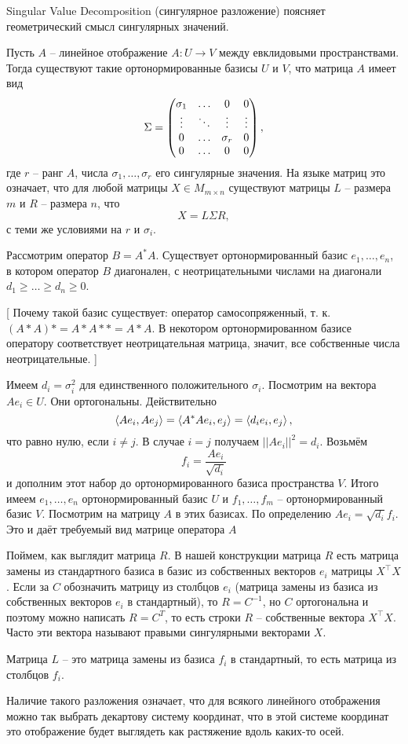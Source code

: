 Singular Value Decomposition (сингулярное разложение) поясняет геометрический смысл сингулярных значений.

 Пусть $A$ -- линейное отображение $A\colon U \to V$ между евклидовыми пространствами. Тогда существуют такие ортонормированные базисы $U$ и $V$, что матрица $A$ имеет вид 
$$\Sigma = \begin{pmatrix} \sigma_1 &\dots& 0 & 0\\
 \vdots & \ddots &\vdots & \vdots\\
 0 & \dots & \sigma_r & 0\\
 0 &  \dots & 0 & 0 \end{pmatrix},$$
 где $r$ -- ранг $A$, числа $\sigma_1, \dots, \sigma_r$ его сингулярные значения.
На языке матриц это означает, что для любой матрицы $X \in M_{m\times n}$ существуют матрицы $L$ -- размера $m$ и $R$ -- размера $n$,  что
$$X= L \Sigma R,$$
 с теми же условиями на $r$ и $\sigma_i$.
 
\proof Рассмотрим оператор $B = A^{*}A$. Существует ортонормированный базис $e_1,\dots,e_n$, в котором оператор $B$ диагонален, с неотрицательными числами на диагонали $d_1\geq\dots\geq d_n\geq 0$. 

[ Почему такой базис существует: оператор самосопряженный, т. к. $(A*A)* = A*A** = A*A$. В некотором ортонормированном базисе оператору соответствует неотрицательная матрица, значит, все собственные числа неотрицательные. ]

Имеем  $d_i=\sigma_i^2$ для единственного положительного $\sigma_i$. 
Посмотрим на вектора $Ae_i \in U$. Они ортогональны. Действительно
$$\left\langle Ae_i, Ae_j\right\rangle = \left\langle A^{*}Ae_i,e_j \right\rangle = \left\langle d_i e_i,e_j\right\rangle,$$
что равно нулю, если $i\neq j$. В случае $i=j$ получаем $||Ae_i||^2=d_i$. Возьмём 
$$f_i=\frac{Ae_i}{\sqrt{d_i}}$$
и дополним этот набор до ортонормированного базиса пространства $V$. Итого имеем $e_1,\dots,e_n$ ортонормированный базис $U$ и $f_1,\dots,f_m$ -- ортонормированный базис $V$.
Посмотрим на матрицу $A$ в этих базисах. По определению $Ae_i=\sqrt{d_i}f_i$. Это и даёт требуемый вид матрице оператора $A$

Поймем, как выглядит матрица $R$. В нашей конструкции матрица $R$ есть матрица замены из стандартного базиса в базис из собственных векторов $e_i$ матрицы $X^{\top}X$. Если за $C$ обозначить матрицу из столбцов $e_i$ (матрица замены из базиса из собственных векторов $e_i$ в стандартный), то $R=C^{-1}$, но $C$ ортогональна и поэтому можно написать $R=C^{T}$, то есть строки $R$ -- собственные вектора $X^{\top}X$. Часто эти вектора называют правыми сингулярными векторами $X$.

Матрица $L$ -- это матрица замены из базиса $f_i$ в стандартный, то есть матрица из столбцов $f_i$.

\endproof
\ethrm

Наличие такого разложения означает, что для всякого линейного отображения можно так выбрать декартову систему координат, что в этой системе координат это отображение будет выглядеть как растяжение вдоль каких-то осей.
